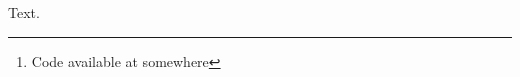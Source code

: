\documentclass{article}
\author{
Mariia Drozdova\\
University of Geneva\\
\texttt{mariia.drozdova@unige.ch}\\
\footnote{Code available at somewhere}
}
\begin{document}
\maketitle
Text.
\end{document}
